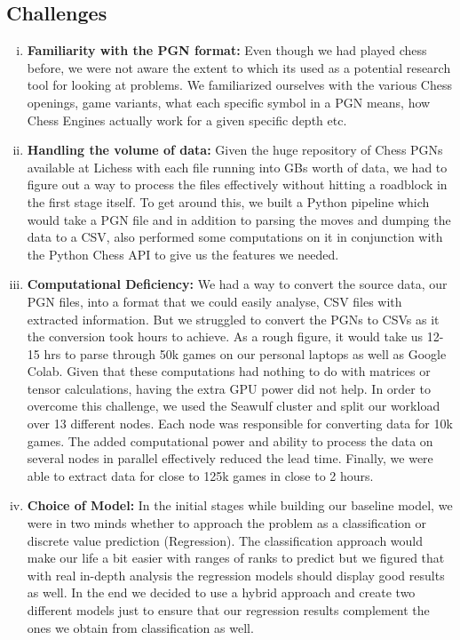 \documentclass[11pt,a4paper]{article}
\begin{document}
\subsection{Challenges}
\begin{enumerate}[(i)]
    \item \textbf{Familiarity with the PGN format:} Even though we had played chess before, we were not aware the extent to which its used as a potential research tool for looking at problems. We familiarized ourselves with the various Chess openings, game variants, what each specific symbol in a PGN means, how Chess Engines actually work for a given specific depth etc.
    \item \textbf{Handling the volume of data:} Given the huge repository of Chess PGNs available at Lichess with each file running into GBs worth of data, we had to figure out a way to process the files effectively without hitting a roadblock in the first stage itself. To get around this, we built a Python pipeline which would take a PGN file and in addition to parsing the moves and dumping the data to a CSV, also performed some computations on it in conjunction with the Python Chess API to give us the features we needed.
    \item \textbf{Computational Deficiency:} We had a way to convert the source data, our PGN files, into a format that we could easily analyse, CSV files with extracted information. But we struggled to convert the PGNs to CSVs as it the conversion took hours to achieve. As a rough figure, it would take us 12-15 hrs to parse through 50k games on our personal laptops as well as Google Colab. Given that these computations had nothing to do with matrices or tensor calculations, having the extra GPU power did not help. In order to overcome this challenge, we used the Seawulf cluster and split our workload over 13 different nodes. Each node was responsible for converting data for 10k games. The added computational power and ability to process the data on several nodes in parallel effectively reduced the lead time. Finally, we were able to extract data for close to 125k games in close to 2 hours.
    \item \textbf{Choice of Model:}
    In the initial stages while building our baseline model, we were in two minds whether to approach the problem as a classification or discrete value prediction (Regression). The classification approach would make our life a bit easier with ranges of ranks to predict but we figured that with real in-depth analysis the regression models should display good results as well. In the end we decided to use a hybrid approach and create two different models just to ensure that our regression results complement the ones we obtain from classification as well. 
\end{enumerate}
\end{document}
